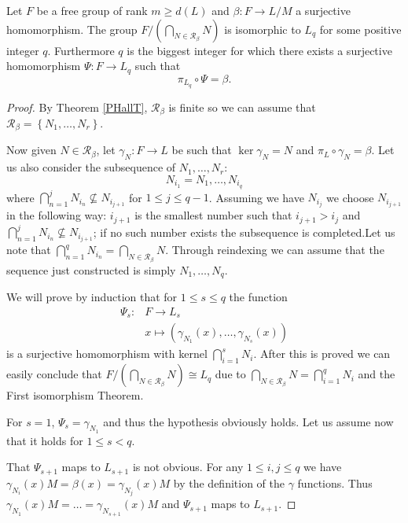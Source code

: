 \begin{theorem}
    \label{QF}
    Let $F$ be a free group of rank $m \ge d(L)$ and $\beta \colon F \rightarrow L/M$ a surjective homomorphism. The group $F/(\bigcap_{N \in \mathscr{R}_\beta}N)$ is isomorphic to $L_q$ for some positive integer $q$. Furthermore $q$ is the biggest integer for which there exists a surjective homomorphism $\Psi \colon F \rightarrow L_q$ such that 
    $$ 
    \pi_{L_q} \circ \Psi = \beta.
    $$
\end{theorem}

\begin{proof}
    By Theorem \ref{PHallT}, $\mathscr{R}_\beta$ is finite so we can assume that $\mathscr{R}_\beta = \left\{ N_1,\ldots ,N_r \right\}$.

    Now given $N \in \mathscr{R}_\beta$, let $\gamma_N \colon F \rightarrow L$ be such that $\ker \gamma_N = N$ and $\pi_L \circ \gamma_N = \beta$. Let us also consider the subsequence of $N_1, \ldots , N_r$:
    $$N_{i_1} = N_1, \ldots , N_{i_q}$$
    where $\bigcap_{n=1}^{j}N_{i_n} \nsubseteq N_{i_{j+1}}$ for $1 \le j \le q-1$. Assuming we have $N_{i_j}$ we choose $N_{i_{j+1}}$ in the following way: $i_{j+1}$ is the smallest number such that $i_{j+1} > i_j$ and $\bigcap_{n=1}^{j}N_{i_n} \nsubseteq N_{i_{j+1}}$; if no such number exists the subsequence is completed.Let us note that $\bigcap_{n = 1}^{q}N_{i_n} = \bigcap_{N \in \mathscr{R}_\beta}N$.
    Through reindexing we can assume that the sequence just constructed is simply $N_1,\ldots ,N_q$.
    
    We will prove by induction that for $1 \le s \le q$ the function
    \begin{align*}
        \Psi_s \colon &F \rightarrow L_s \\
                    &x \mapsto (\gamma_{N_1}(x), \ldots  , \gamma_{N_s}(x))
    \end{align*}
    is a surjective homomorphism with kernel $\bigcap_{i=1}^s N_i$. After this is proved we can easily conclude that $F/(\bigcap_{N \in \mathscr{R}_\beta}N) \cong L_q$ due to $\bigcap_{N \in \mathscr{R}_\beta}N = \bigcap_{i=1}^q N_i$ and the First isomorphism Theorem.
    
    For $s = 1$, $\Psi_s = \gamma_{N_1}$ and thus the hypothesis obviously holds. Let us assume now that it holds for $1 \le s < q$.

    That $\Psi_{s+1}$ maps to $L_{s+1}$ is not obvious. For any $1 \le i,j \le q$ we have $\gamma_{N_i}(x)M = \beta(x) = \gamma_{N_j}(x)M$ by the definition of the $\gamma$ functions. Thus $\gamma_{N_1}(x)M = \ldots  = \gamma_{N_{s+1}}(x)M$ and $\Psi_{s+1}$ maps to $L_{s+1}$.


\end{proof}
